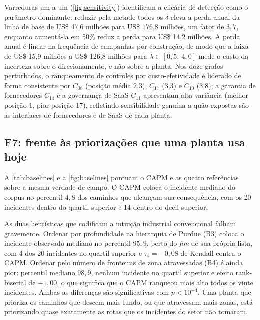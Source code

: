 Varreduras um-a-um (\cref{fig:sensitivity}) identificam a eficácia de detecção
como o parâmetro dominante: reduzir pela metade todos os $\delta$ eleva a perda
anual da linha de base de US\$ 47,6 milhões para US\$ 176,8 milhões, um fator
de $3{,}7$, enquanto aumentá-la em 50\% reduz a perda para US\$ 14,2 milhões. A
perda anual é linear na frequência de campanhas por construção, de modo que a
faixa de US\$ 15,9 milhões a US\$ 126,8 milhões para
$\lambda \in [0{,}5;\ 4{,}0]$ mede o custo da incerteza sobre o direcionamento,
e não sobre a planta. Nos doze grafos perturbados, o ranqueamento de controles
por custo-efetividade é liderado de forma consistente por $C_{08}$ (posição
média 2,3), $C_{17}$ (3,3) e $C_{10}$ (3,8); a garantia de fornecedores
$C_{14}$ e a governança de SaaS $C_{11}$ apresentam alta variância (melhor
posição 1, pior posição 17), refletindo sensibilidade genuína a quão expostas
são as interfaces de fornecedores e de SaaS de cada planta.



\subsection{F7: frente às priorizações que uma planta usa hoje}

A \cref{tab:baselines} e a \cref{fig:baselines} pontuam o CAPM e as quatro
referências sobre a mesma verdade de campo. O CAPM coloca o incidente mediano do
corpus no percentil $4{,}8$ dos caminhos que alcançam sua consequência, com os 20
incidentes dentro do quartil superior e 14 dentro do decil superior.

As duas heurísticas que codificam a intuição industrial convencional falham
gravemente. Ordenar por profundidade na hierarquia de Purdue (B3) coloca o
incidente observado mediano no percentil $95{,}9$, perto do \emph{fim} de sua própria lista, com 4 dos 20
incidentes no quartil superior e
$\tau_b = -0{,}08$ de Kendall contra o CAPM. Ordenar pelo número de fronteiras de
zona atravessadas (B4) é ainda pior: percentil mediano $98{,}9$, nenhum incidente
no quartil superior e efeito rank-biserial de $-1{,}00$, o que significa que o
CAPM ranqueou mais alto todos os vinte incidentes. Ambas as diferenças são
significativas com $p < 10^{-4}$. Uma planta que prioriza os caminhos que descem
mais fundo, ou que atravessam mais zonas, está priorizando quase exatamente as
rotas que os incidentes do setor não tomaram.

